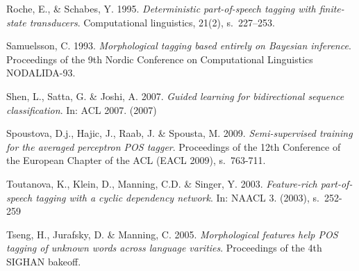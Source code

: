 \documentclass[utf8,bachelor,manualbib]{gradu3}
\begin{document}
\begin{thebibliography}{}
Roche, E., \& Schabes, Y. 1995. \textit{Deterministic part-of-speech tagging with finite-state transducers}. Computational linguistics, 21(2), s.~227--253.

Samuelsson, C. 1993. \textit{Morphological tagging based entirely on Bayesian inference}. Proceedings of the 9th Nordic Conference on Computational Linguistics NODALIDA-93.

Shen, L., Satta, G. \& Joshi, A. 2007. \textit{Guided learning for bidirectional sequence classification}. In: ACL 2007. (2007)

Spoustova, D.j., Hajic, J., Raab, J. \& Spousta, M. 2009. \textit{Semi-supervised training for the averaged perceptron POS tagger}. Proceedings of the 12th Conference of the
European Chapter of the ACL (EACL 2009), s.~763-711.

Toutanova, K., Klein, D., Manning, C.D. \& Singer, Y. 2003. \textit{Feature-rich part-of-speech tagging with a cyclic dependency network}. In: NAACL 3. (2003), s.~252-259

Tseng, H., Jurafsky, D. \& Manning, C. 2005. \textit{Morphological features help POS tagging of unknown words across language varities}. Proceedings of the 4th SIGHAN bakeoff.

\end{thebibliography}
\end{document}
